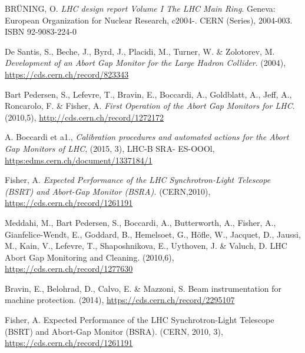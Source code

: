 %
{\printbibliography}{

    \begin{thebibliography}{99}
	
         BR\"UNING, O. \emph{LHC design report Volume I The LHC
            Main Ring}. Geneva: European Organization for Nuclear Research, c2004-. CERN
            (Series), 2004-003. ISBN 92-9083-224-0

        De Santis, S., Beche, J., Byrd, J., Placidi, M.,
            Turner, W. \& Zolotorev, M. \emph{Development of an Abort Gap Monitor for the
            Large Hadron Collider}.  (2004), \url{https://cds.cern.ch/record/823343}

        Bart Pedersen, S., Lefevre, T., Bravin, E., Boccardi, A.,
            Goldblatt, A., Jeff, A., Roncarolo, F. \& Fisher, A. \emph{First Operation of
            the Abort Gap Monitors for LHC}.  (2010,5), \url{http://cds.cern.ch/record/1272172}

         A. Boccardi et a1., \emph{Calibration procedures and
            automated actions for the Abort Gap Monitors of LHC}, (2015, 3), LHC-B SRA-
            ES-OOOl, \url{https:edms.cern.ch/document/1337184/1}

        Fisher, A. \emph{Expected Performance of the LHC
            Synchrotron-Light Telescope (BSRT) and Abort-Gap Monitor (BSRA).}
            (CERN,2010), \url{https://cds.cern.ch/record/1261191}

        Meddahi, M., Bart Pedersen, S., Boccardi, A.,
            Butterworth, A., Fisher, A., Gianfelice-Wendt, E., Goddard, B., Hemelsoet,
            G., Höfle, W., Jacquet, D., Jaussi, M., Kain, V., Lefevre, T., Shaposhnikova,
            E., Uythoven, J. \& Valuch, D. LHC Abort Gap Monitoring and Cleaning.
            (2010,6), \url{https://cds.cern.ch/record/1277630}

        Bravin, E., Belohrad, D., Calvo, E. \& Mazzoni, S. Beam
            instrumentation for machine protection.  (2014), \url{https://cds.cern.ch/record/2295107}

        Fisher, A. Expected Performance of the LHC
            Synchrotron-Light Telescope (BSRT) and Abort-Gap Monitor (BSRA).
            (CERN, 2010, 3), \url{https://cds.cern.ch/record/1261191}



    \end{thebibliography}
} %
